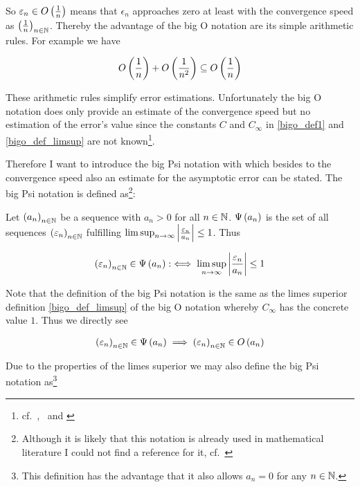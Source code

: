 So $\varepsilon_n \in O\left( {\frac 1n} \right)$ means that $\epsilon_n$ approaches zero at least with the convergence speed as $\left({\frac 1n}\right)_{{n}\in\mathbb N}$. Thereby the advantage of the big O notation are its simple arithmetic rules. For example we have

\begin{align}
  O\left( {\frac 1n} \right) + O\left( {\frac 1{n^2}} \right) \subseteq O\left( {\frac 1n} \right)
\end{align}

These arithmetic rules simplify error estimations. Unfortunately the big O notation does only provide an estimate of the convergence speed but no estimation of the error's value since the constants $C$ and $C_\infty$ in \eqref{bigo_def1} and \eqref{bigo_def_limsup} are not known\footnote{cf.~\cite[p.~444]{graham},~\cite{hurkyl_bigo} and \cite{templatetypedef_bigo}}.

Therefore I want to introduce the big Psi notation with which besides to the convergence speed also an estimate for the asymptotic error can be stated. The big Psi notation is defined as\footnote{Although it is likely that this notation is already used in mathematical literature I could not find a reference for it, cf.~\cite{tampis_bigpsi}}:

\begin{definition}
  Let $\left({a_n}\right)_{{n}\in\mathbb N}$ be a sequence with $a_n > 0$ for all $n\in\mathbb N$. $\Psi\left( {a_n} \right)$ is the set of all sequences $\left({\varepsilon_n}\right)_{{n}\in\mathbb N}$ fulfilling $\limsup_{n\to\infty} \left|{\frac{\varepsilon_n}{a_n}}\right| \le 1$. Thus

  \begin{align}
    \left({\varepsilon_n}\right)_{{n}\in\mathbb N} \in \Psi\left( {a_n} \right) :\iff \limsup_{n\to\infty} \left|{\frac{\varepsilon_n}{a_n}}\right| \le 1
  \end{align}

\end{definition}

Note that the definition of the big Psi notation is the same as the limes superior definition \eqref{bigo_def_limsup} of the big O notation whereby $C_\infty$ has the concrete value $1$. Thus we directly see

\begin{align}
  \left({\varepsilon_n}\right)_{{n}\in\mathbb N} \in \Psi\left( {a_n} \right) \implies \left({\varepsilon_n}\right)_{{n}\in\mathbb N} \in O\left( {a_n} \right)
\end{align}

\noindent Due to the properties of the limes superior we may also define the big Psi notation as\footnote{This definition has the advantage that it also allows $a_n=0$ for any $n\in\mathbb N$.}


